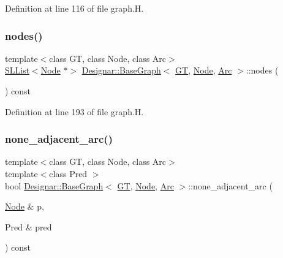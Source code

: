 Definition at line 116 of file graph.\+H.

\mbox{\label{class_designar_1_1_base_graph_a1fa17e5398e3f9791e1a9413a2326473}} 
\subsubsection{\texorpdfstring{nodes()}{nodes()}}
{\footnotesize\ttfamily template$<$class GT, class Node, class Arc$>$ \\
\hyperlink{class_designar_1_1_s_l_list}{S\+L\+List}$<$\hyperlink{namespace_designar_a5af326c65aa2bd26b26c410f2030d09e}{Node} $\ast$$>$ \hyperlink{class_designar_1_1_base_graph}{Designar\+::\+Base\+Graph}$<$ \hyperlink{demo-buildgraph_8_c_a3001c40d2c31ca87ed96cd7d1334a55e}{GT}, \hyperlink{namespace_designar_a5af326c65aa2bd26b26c410f2030d09e}{Node}, \hyperlink{namespace_designar_a3f55fb5513d62ff47cbc8f72b8e95d6f}{Arc} $>$\+::nodes (\begin{DoxyParamCaption}{ }\end{DoxyParamCaption}) const\hspace{0.3cm}{\ttfamily [inline]}}



Definition at line 193 of file graph.\+H.

\mbox{\label{class_designar_1_1_base_graph_acf4b230e0d981f36770722011c96206f}} 
\subsubsection{\texorpdfstring{none\+\_\+adjacent\+\_\+arc()}{none\_adjacent\_arc()}\hspace{0.1cm}{\footnotesize\ttfamily [1/2]}}
{\footnotesize\ttfamily template$<$class GT, class Node, class Arc$>$ \\
template$<$class Pred $>$ \\
bool \hyperlink{class_designar_1_1_base_graph}{Designar\+::\+Base\+Graph}$<$ \hyperlink{demo-buildgraph_8_c_a3001c40d2c31ca87ed96cd7d1334a55e}{GT}, \hyperlink{namespace_designar_a5af326c65aa2bd26b26c410f2030d09e}{Node}, \hyperlink{namespace_designar_a3f55fb5513d62ff47cbc8f72b8e95d6f}{Arc} $>$\+::none\+\_\+adjacent\+\_\+arc (\begin{DoxyParamCaption}\item[{\hyperlink{namespace_designar_a5af326c65aa2bd26b26c410f2030d09e}{Node} \&}]{p,  }\item[{Pred \&}]{pred }\end{DoxyParamCaption}) const\hspace{0.3cm}{\ttfamily [inline]}}



